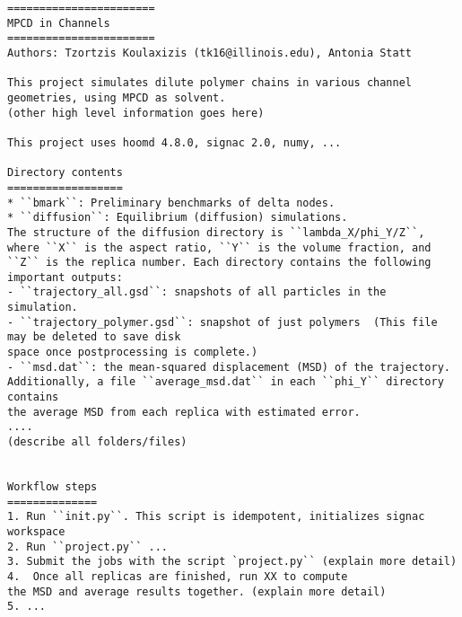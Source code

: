 \documentclass{article}
\begin{document}
\begin{lstlisting}
=======================
MPCD in Channels
=======================
Authors: Tzortzis Koulaxizis (tk16@illinois.edu), Antonia Statt

This project simulates dilute polymer chains in various channel geometries, using MPCD as solvent. 
(other high level information goes here) 

This project uses hoomd 4.8.0, signac 2.0, numy, ... 

Directory contents
==================
* ``bmark``: Preliminary benchmarks of delta nodes.
* ``diffusion``: Equilibrium (diffusion) simulations.
The structure of the diffusion directory is ``lambda_X/phi_Y/Z``,
where ``X`` is the aspect ratio, ``Y`` is the volume fraction, and
``Z`` is the replica number. Each directory contains the following
important outputs:
- ``trajectory_all.gsd``: snapshots of all particles in the simulation.
- ``trajectory_polymer.gsd``: snapshot of just polymers  (This file may be deleted to save disk
space once postprocessing is complete.)
- ``msd.dat``: the mean-squared displacement (MSD) of the trajectory.
Additionally, a file ``average_msd.dat`` in each ``phi_Y`` directory contains
the average MSD from each replica with estimated error.
.... 
(describe all folders/files) 


Workflow steps
==============
1. Run ``init.py``. This script is idempotent, initializes signac workspace 
2. Run ``project.py`` ...
3. Submit the jobs with the script `project.py`` (explain more detail)
4.  Once all replicas are finished, run XX to compute
the MSD and average results together. (explain more detail)
5. ... 
\end{lstlisting}
\end{document}

